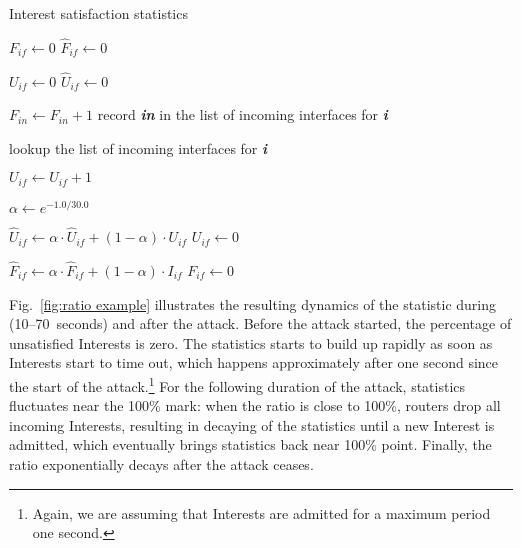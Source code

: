 \begin{algorithm}[h]
\footnotesize
\caption{\small Interest satisfaction statistics}
\label{algo:interest stats}
\begin{algorithmic}[1]

    \State $F_{if} \leftarrow 0$ 
    \State $\hat F_{if} \leftarrow 0$ 

    \State $U_{if} \leftarrow 0$ 
    \State $\hat U_{if} \leftarrow 0$ 
\EndFor

\vspace{0.1cm}
  \State $F_{in} \leftarrow F_{in} + 1$
  \State record \textbf{\emph{in}} in the list of incoming interfaces for \textbf{\emph{i}}
\EndFunction

\vspace{0.1cm}
    \State lookup the list of incoming interfaces for \textbf{\emph{i}}

        \State $U_{if} \leftarrow U_{if} + 1$
    \EndFor
\EndFunction

\vspace{0.1cm}

\State {} 
 
\State $\alpha \leftarrow e^{-1.0/30.0}$  %

    \State $\hat U_{if} \leftarrow \alpha \cdot \hat U_{if} + (1 - \alpha) \cdot U_{if}$ 
    \State $U_{if} \leftarrow 0$ 

     
        \State $\hat F_{if} \leftarrow \alpha \cdot \hat F_{if} + (1 - \alpha) \cdot I_{if}$ 
        \State $F_{if} \leftarrow 0$ 
    \EndIf
\EndFor

\EndFunction

\end{algorithmic}
\end{algorithm}


Fig.~\ref{fig:ratio example} illustrates the resulting dynamics of the statistic during (10--70~seconds) and after the attack.
Before the attack started, the percentage of unsatisfied Interests is zero.  
The statistics starts to build up rapidly as soon as Interests start to time out, which happens approximately after one second since the start of the attack.\footnote{Again, we are assuming that Interests are admitted for a maximum period one second.}
For the following duration of the attack, statistics fluctuates near the 100\% mark: 
when the ratio is close to 100\%, routers drop all incoming Interests, resulting in decaying of the statistics until a new Interest is admitted, which eventually brings statistics back near 100\% point.
Finally, the ratio exponentially decays after the attack ceases.

